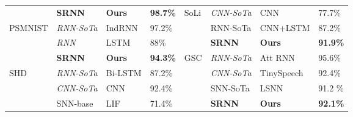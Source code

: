 \documentclass[fleqn,10pt]{wlscirep}
\begin{document}
\begin{table}[]
\begin{tabular}{|l|l|l|l|l|l|l|l|}
                         & \cellcolor{green}\bf SRNN & \cellcolor{green}\bf Ours          & \cellcolor{green}\bf 98.7\% & \multirow{3}{*}{SoLi}  & \em CNN-SoTa                                   & CNN\cite{wang2016interacting}            & 77.7\%                                                      \\ \cline{1-4} \cline{6-8} 
\multirow{3}{*}{PSMNIST} & \em  RNN-SoTa           & IndRNN\cite{li2018independently}        & 97.2\%                                    &                        & RNN-SoTa                                                      & CNN+LSTM\cite{wang2016interacting}       & 87.2\%                                                      \\ \cline{2-4} \cline{6-8} 
                         & \em  RNN                & LSTM\cite{arjovsky2016unitary} & 88\%                                      &                        & \cellcolor{green}\bf SRNN                        & \cellcolor{green}\bf Ours                    & \cellcolor{green}\bf 91.9\%                     \\ \cline{2-8} 
                         & \cellcolor{green}\bf SRNN & \cellcolor{green}\bf Ours          & \cellcolor{green}\bf 94.3\% & \multirow{4}{*}{GSC}   & \em  RNN-SoTa                                  & Att RNN\cite{de2018neural}               & 95.6\%                                                       \\ \cline{1-4} \cline{6-8} 
\multirow{6}{*}{SHD}     & \em  RNN-SoTa           & Bi-LSTM                                         & 87.2\%                                   &                        & \em CNN-SoTa                                                      & TinySpeech\cite{wong2020tinyspeech}            & 92.4\%                                                 \\ \cline{2-4} \cline{6-8} 
                         & \em  CNN-SoTa           & CNN\cite{cramer2019heidelberg} & 92.4\%                                    &                        & SNN-SoTa                                                      & LSNN\cite{bellec2020solution}            & 91.2  \%                   \\ \cline{2-4} \cline{6-8} 
                         & SNN-base                               & LIF\cite{cramer2019heidelberg} & 71.4\%                                    &                        &\cellcolor{green}\bf SRNN                        & \cellcolor{green}\bf Ours                    & \cellcolor{green}\bf 92.1\%                                                             \\ \cline{2-8} 

\end{tabular}
\end{table}
\end{document}

